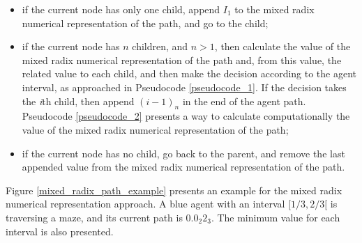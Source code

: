 \begin{itemize}
\item if the current node has only one child, append $I_{1}$ to the mixed radix numerical representation of the path, and go to the child;

\item if the current node has $n$ children, and $n > 1$, then calculate the value of the mixed radix numerical representation of the path and, from this value, the related value to each child, and then make the decision according to the agent interval, as approached in Pseudocode \ref{pseudocode_1}. If the decision takes the \textit{i}th child, then append $(i-1)_{n}$ in the end of the agent path. Pseudocode \ref{pseudocode_2} presents a way to calculate computationally the value of the mixed radix numerical representation of the path;

\item if the current node has no child, go back to the parent, and remove the last appended value from the mixed radix numerical representation of the path.
\end{itemize}

Figure \ref{mixed_radix_path_example} presents an example for the mixed radix numerical representation approach. A blue agent with an interval $[1/3,2/3[$ is traversing a maze, and its current path is $0.0_{2}2_{3}$. The minimum value for each interval is also presented.

